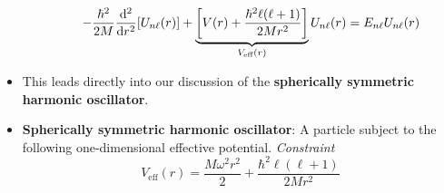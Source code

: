 \documentclass[../notes.tex]{subfiles}
\begin{document}
\begin{itemize}
\begin{itemize}
\begin{equation*}
            -\frac{\hbar^2}{2M}\dv[2]{r}[U_{n\ell}(r)]+\underbrace{\left[ V(r)+\frac{\hbar^2\ell(\ell+1)}{2Mr^2} \right]}_{V_\text{eff}(r)}U_{n\ell}(r) = E_{n\ell}U_{n\ell}(r)
        \end{equation*}
    \end{itemize}
    \item This leads directly into our discussion of the \textbf{spherically symmetric harmonic oscillator}.
    \item \textbf{Spherically symmetric harmonic oscillator}: A particle subject to the following one-dimensional effective potential. \emph{Constraint}
    \begin{equation*}
        V_\text{eff}(r) = \frac{M\omega^2r^2}{2}+\frac{\hbar^2\ell(\ell+1)}{2Mr^2}
    \end{equation*}
    \begin{figure}[h!]
        \centering
\end{figure}
\end{itemize}
\end{document}
